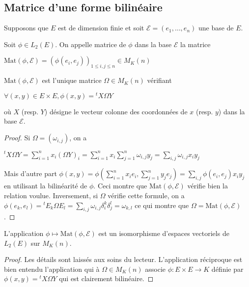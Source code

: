 \subsection{Matrice d'une forme bilinéaire}

Supposons que $E$ est de dimension finie et soit $\mathcal{E} = (e_1,\ldots,e_n)$ une base de $E$.

\begin{de}
Soit $\phi \in L_2(E)$. On appelle matrice de $\phi$ dans la base $\mathcal{E}$ la matrice

$\mathrm{Mat}(\phi,\mathcal{E}) = (\phi(e_i,e_j))_{1 \leq i,j \leq n} \in M_K(n)$
\end{de}

\begin{prop}
$\mathrm{Mat}(\phi,\mathcal{E})$ est l'unique matrice $\Omega \in M_K(n)$ vérifiant

$\forall (x,y) \in E \times E, \phi(x,y) = {}^t X \Omega Y$

où $X$ (resp. $Y$) désigne le vecteur colonne des coordonnées de $x$ (resp. $y$) dans la base $\mathcal{E}$.
\end{prop}

\begin{proof}
Si $\Omega = (\omega_{i,j})$, on a

${}^t X \Omega Y = \sum_{i=1}^n x_i (\Omega Y)_i = \sum_{i=1}^n x_i \sum_{j=1}^n \omega_{i,j} y_j = \sum_{i,j} \omega_{i,j} x_i y_j$

Mais d'autre part $\phi(x,y) = \phi(\sum_{i=1}^n x_i e_i, \sum_{j=1}^n y_j e_j) = \sum_{i,j} \phi(e_i,e_j) x_i y_j$ en utilisant la bilinéarité de $\phi$. Ceci montre que $\mathrm{Mat}(\phi,\mathcal{E})$ vérifie bien la relation voulue. Inversement, si $\Omega$ vérifie cette formule, on a $\phi(e_k,e_l) = {}^t E_k \Omega E_l = \sum_{i,j} \omega_{i,j} \delta_i^k \delta_j^l = \omega_{k,l}$ ce qui montre que $\Omega = \mathrm{Mat}(\phi,\mathcal{E})$.
\end{proof}

\begin{thm}
L'application $\phi \mapsto \mathrm{Mat}(\phi,\mathcal{E})$ est un isomorphisme d'espaces vectoriels de $L_2(E)$ sur $M_K(n)$.
\end{thm}

\begin{proof}
Les détails sont laissés aux soins du lecteur. L'application réciproque est bien entendu l'application qui à $\Omega \in M_K(n)$ associe $\phi : E \times E \rightarrow K$ définie par $\phi(x,y) = {}^t X \Omega Y$ qui est clairement bilinéaire.
\end{proof}


